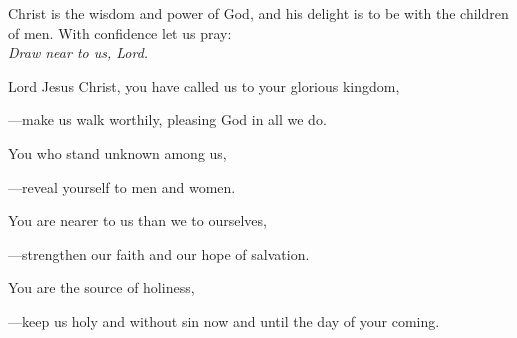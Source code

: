 \intercessions\indent

\begin{hangpar}

Christ is the wisdom and power of God, and his delight is to be with the children of men. With confidence let us pray:\\
\emph{Draw near to us, Lord.}

\medskip Lord Jesus Christ, you have called us to your glorious kingdom,

{\color{red}---\thinspace}make us walk worthily, pleasing God in all we do.

\medskip You who stand unknown among us,

{\color{red}---\thinspace}reveal yourself to men and women.

\medskip You are nearer to us than we to ourselves,

{\color{red}---\thinspace}strengthen our faith and our hope of salvation.

\medskip You are the source of holiness,

{\color{red}---\thinspace}keep us holy and without sin now and until the day of your coming.

\end{hangpar}